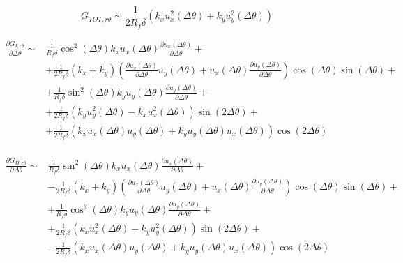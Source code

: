 \documentclass[a4paper]{jpconf}
\begin{document}
\begin{equation}
G_{TOT,r\theta} \sim\frac{1}{2R_{f}\delta}\left( k_{x}u^{2}_{x}\left(\Delta\theta\right)+ k_{y}u^{2}_{y}\left(\Delta\theta\right)\right)
\end{equation}

\begin{equation}
\begin{split}
\frac{\partial G_{I,r\theta}}{\partial\Delta\theta} \sim&\frac{1}{R_{f}\delta}\cos^{2}\left(\Delta\theta\right) k_{x}u_{x}\left(\Delta\theta\right)\frac{\partial u_{x}\left(\Delta\theta\right)}{\partial\Delta\theta}+\\
&+\frac{1}{2R_{f}\delta}\left(k_{x}+k_{y}\right)\left(\frac{\partial u_{x}\left(\Delta\theta\right)}{\partial\Delta\theta}u_{y}\left(\Delta\theta\right)+u_{x}\left(\Delta\theta\right)\frac{\partial u_{y}\left(\Delta\theta\right)}{\partial\Delta\theta}\right)\cos\left(\Delta\theta\right)\sin\left(\Delta\theta\right)+\\
&+\frac{1}{R_{f}\delta}\sin^{2}\left(\Delta\theta\right)k_{y}u_{y}\left(\Delta\theta\right)\frac{\partial u_{y}\left(\Delta\theta\right)}{\partial\Delta\theta}+\\
&+\frac{1}{2R_{f}\delta}\left(k_{y}u^{2}_{y}\left(\Delta\theta\right)- k_{x}u^{2}_{x}\left(\Delta\theta\right)\right)\sin\left(2\Delta\theta\right)+\\
&+\frac{1}{2R_{f}\delta}\left(k_{x}u_{x}\left(\Delta\theta\right)u_{y}\left(\Delta\theta\right)+k_{y}u_{y}\left(\Delta\theta\right)u_{x}\left(\Delta\theta\right)\right)\cos\left(2\Delta\theta\right)\\
\end{split}
\end{equation}

\begin{equation}
\begin{split}
\frac{\partial G_{II,r\theta}}{\partial\Delta\theta} \sim&\frac{1}{R_{f}\delta}\sin^{2}\left(\Delta\theta\right) k_{x}u_{x}\left(\Delta\theta\right)\frac{\partial u_{x}\left(\Delta\theta\right)}{\partial\Delta\theta}+\\
&-\frac{1}{2R_{f}\delta}\left(k_{x}+k_{y}\right)\left(\frac{\partial u_{x}\left(\Delta\theta\right)}{\partial\Delta\theta}u_{y}\left(\Delta\theta\right)+u_{x}\left(\Delta\theta\right)\frac{\partial u_{y}\left(\Delta\theta\right)}{\partial\Delta\theta}\right)\cos\left(\Delta\theta\right)\sin\left(\Delta\theta\right)+\\
&+\frac{1}{R_{f}\delta}\cos^{2}\left(\Delta\theta\right)k_{y}u_{y}\left(\Delta\theta\right)\frac{\partial u_{y}\left(\Delta\theta\right)}{\partial\Delta\theta}+\\
&+\frac{1}{2R_{f}\delta}\left(k_{x}u^{2}_{x}\left(\Delta\theta\right)- k_{y}u^{2}_{y}\left(\Delta\theta\right)\right)\sin\left(2\Delta\theta\right)+\\
&-\frac{1}{2R_{f}\delta}\left(k_{x}u_{x}\left(\Delta\theta\right)u_{y}\left(\Delta\theta\right)+k_{y}u_{y}\left(\Delta\theta\right)u_{x}\left(\Delta\theta\right)\right)\cos\left(2\Delta\theta\right)\\
\end{split}
\end{equation}
\end{document}
